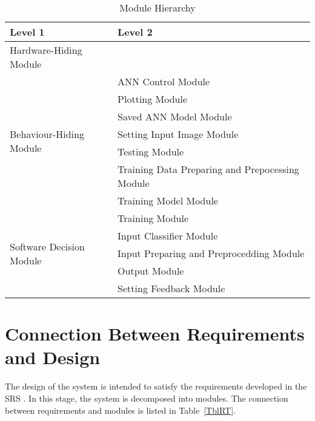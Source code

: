 \documentclass[12pt, titlepage]{article}
\begin{document}
\begin{table}[h!]
\centering
\begin{tabular}{p{} p{}}
\toprule
\textbf{Level 1} & \textbf{Level 2}\\
\midrule

{Hardware-Hiding Module} & ~ \\
\midrule

\multirow{7}{0.3\textwidth}{Behaviour-Hiding Module}
& ANN Control Module\\
& Plotting Module\\
& Saved ANN Model Module\\
& Setting Input Image Module\\
& Testing Module\\ 
& Training Data Preparing and Prepocessing Module\\
& Training Model Module\\
& Training Module\\
\midrule

\multirow{3}{0.3\textwidth}{Software Decision Module}
& Input Classifier Module\\
& Input Preparing and Preprocedding Module\\
& Output Module\\
& Setting Feedback Module\\
\bottomrule

\end{tabular}
\caption{Module Hierarchy}
\label{TblMH}
\end{table}

\section{Connection Between Requirements and Design} \label{SecConnection}

The design of the system is intended to satisfy the requirements developed in
the SRS \cite{SRS}. In this stage, the system is decomposed into modules. The connection
between requirements and modules is listed in Table~\ref{TblRT}.

\end{document}
